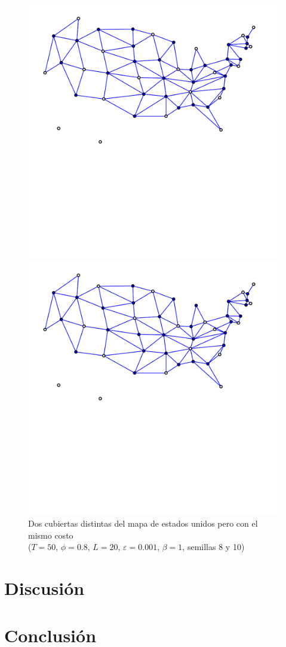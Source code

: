 \documentclass{article}
\begin{document}
  \begin{figure}[H]
    \centering
    \begin{minipage}{.5\textwidth}
      \centering
      \includegraphics[scale=0.35]{usa}
    \end{minipage}%
    \begin{minipage}{.5\textwidth}
      \centering
      \includegraphics[scale=0.35]{usa2}
    \end{minipage}
    \caption{Dos cubiertas distintas del mapa de estados unidos pero con el mismo 
      costo\\
      ($T=50$, $\phi=0.8$, $L=20$, $\varepsilon = 0.001$, $\beta=1$, semillas 8 y 10)}
  \end{figure}

  \section{Discusión} \label{discussion}

  \section{Conclusión} \label{conclussion}
  
\end{document}
